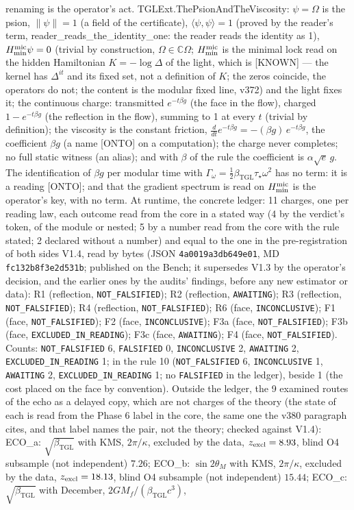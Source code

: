 \documentclass[11pt]{article}
\newcommand{\bTGL}{\beta_{\mathrm{TGL}}}\newcommand{\Msun}{M_{\odot}}\newcommand{\TGL}{\mathrm{TGL}}
\theoremstyle{definition}\newtheorem{deriv}{Derivation}
\begin{document}
renaming is the operator's act. \textsf{TGLExt.ThePsionAndTheViscosity}: $\psi=\Omega$ is the psion, $\|\psi\|=1$ (a field of the certificate), $\langle\psi,\psi\rangle=1$ (proved by the reader's term, \textsf{reader\_reads\_the\_identity\_one}: the reader reads the identity as 1), $H_{\min}^{\rm mic}\psi=0$ (trivial by construction, $\Omega\in\mathbb C\Omega$; $H_{\min}^{\rm mic}$ is the minimal lock read on the hidden Hamiltonian $K=-\log\Delta$ of the light, which is \textsf{[KNOWN]} --- the kernel has $\Delta^{it}$ and its fixed set, not a definition of $K$; the zeros coincide, the operators do not; the content is the modular fixed line, v372) and the light fixes it; the continuous charge: transmitted $e^{-t\beta g}$ (the face in the flow), charged $1-e^{-t\beta g}$ (the reflection in the flow), summing to 1 at every $t$ (trivial by definition); the viscosity is the constant friction, $\tfrac{d}{dt}e^{-t\beta g}=-(\beta g)\,e^{-t\beta g}$, the coefficient $\beta g$ (a name \textsf{[ONTO]} on a computation); the charge never completes; no full static witness (an alias); and with $\beta$ of the rule the coefficient is $\alpha\sqrt e\,g$. The identification of $\beta g$ per modular time with $\Gamma_\omega=\tfrac12\bTGL\tau_\star\omega^2$ has no term: it is a reading \textsf{[ONTO]}; and that the gradient spectrum is read on $H_{\min}^{\rm mic}$ is the operator's key, with no term. At runtime, the concrete ledger: 11 charges, one per reading law, each outcome read from the core in a stated way (4 by the verdict's token, of the module or nested; 5 by a number read from the core with the rule stated; 2 declared without a number) and equal to the one in the pre-registration of both sides V1.4, read by bytes (JSON \texttt{4a0019a3db649e01}, MD \texttt{fc132b8f3e2d531b}; published on the Bench; it supersedes V1.3 by the operator's decision, and the earlier ones by the audits' findings, before any new estimator or data): R1 (reflection, \texttt{NOT\_FALSIFIED}); R2 (reflection, \texttt{AWAITING}); R3 (reflection, \texttt{NOT\_FALSIFIED}); R4 (reflection, \texttt{NOT\_FALSIFIED}); R6 (face, \texttt{INCONCLUSIVE}); F1 (face, \texttt{NOT\_FALSIFIED}); F2 (face, \texttt{INCONCLUSIVE}); F3a (face, \texttt{NOT\_FALSIFIED}); F3b (face, \texttt{EXCLUDED\_IN\_READING}); F3c (face, \texttt{AWAITING}); F4 (face, \texttt{NOT\_FALSIFIED}). Counts: \texttt{NOT\_FALSIFIED} 6, \texttt{FALSIFIED} 0, \texttt{INCONCLUSIVE} 2, \texttt{AWAITING} 2, \texttt{EXCLUDED\_IN\_READING} 1; in the rule 10 (\texttt{NOT\_FALSIFIED} 6, \texttt{INCONCLUSIVE} 1, \texttt{AWAITING} 2, \texttt{EXCLUDED\_IN\_READING} 1; no \texttt{FALSIFIED} in the ledger), beside 1 (the cost placed on the face by convention). Outside the ledger, the 9 examined routes of the echo as a delayed copy, which are not charges of the theory (the state of each is read from the Phase 6 label in the core, the same one the v380 paragraph cites, and that label names the pair, not the theory; checked against V1.4): ECO\_a: $\sqrt{\bTGL}$ with KMS, $2\pi/\kappa$, excluded by the data, $z_{\rm excl}=8.93$, blind O4 subsample (not independent) $7.26$; ECO\_b: $\sin 2\theta_M$ with KMS, $2\pi/\kappa$, excluded by the data, $z_{\rm excl}=18.13$, blind O4 subsample (not independent) $15.44$; ECO\_c: $\sqrt{\bTGL}$ with December, $2GM_f/(\bTGL c^3)$, 
\end{document}
